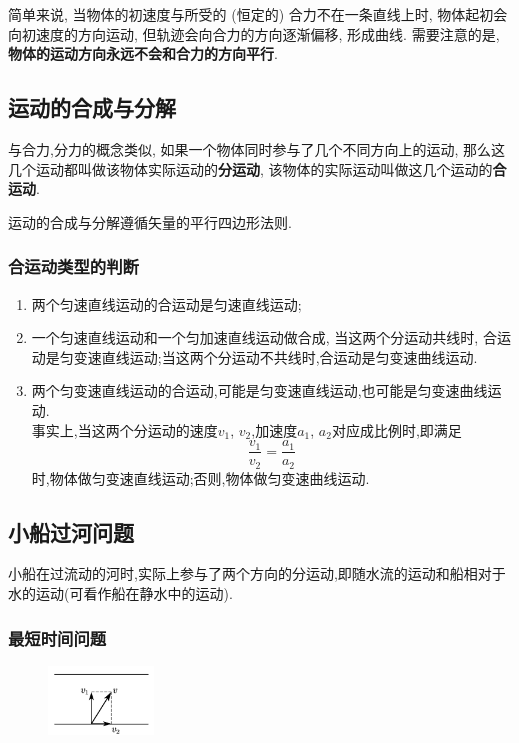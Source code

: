 \documentclass[11pt,a4paper]{ctexart}
\begin{document}
简单来说, 当物体的初速度与所受的 (恒定的) 合力不在一条直线上时, 物体起初会向初速度的方向运动, 但轨迹会向合力的方向逐渐偏移,
形成曲线. 需要注意的是, \textbf{物体的运动方向永远不会和合力的方向平行}.

\subsection{运动的合成与分解}

与合力,分力的概念类似, 如果一个物体同时参与了几个不同方向上的运动,
那么这几个运动都叫做该物体实际运动的\textbf{分运动},
该物体的实际运动叫做这几个运动的\textbf{合运动}.

运动的合成与分解遵循矢量的平行四边形法则.

\subsubsection*{合运动类型的判断}

\setlength{\abovedisplayskip}{3pt}
\setlength{\belowdisplayskip}{3pt}

\begin{enumerate}
	\item 两个匀速直线运动的合运动是匀速直线运动;
	\item 一个匀速直线运动和一个匀加速直线运动做合成, 当这两个分运动共线时,
	      合运动是匀变速直线运动;当这两个分运动不共线时,合运动是匀变速曲线运动.
	\item 两个匀变速直线运动的合运动,可能是匀变速直线运动,也可能是匀变速曲线运动.\\
	      事实上,当这两个分运动的速度$v_1$, $v_2$,加速度$a_1$, $a_2$对应成比例时,即满足
	      $$\frac{v_1}{v_2}=\frac{a_1}{a_2}$$
	      时,物体做匀变速直线运动;否则,物体做匀变速曲线运动.

\end{enumerate}

\subsection{小船过河问题}

小船在过流动的河时,实际上参与了两个方向的分运动,即随水流的运动和船相对于水的运动(可看作船在静水中的运动).

\subsubsection*{最短时间问题}

\begin{figure}
	\flushright
	\includegraphics[width=0.25\textwidth]{pic/pic5.pdf}
	\label{fig5}
\end{figure}
\end{document}
